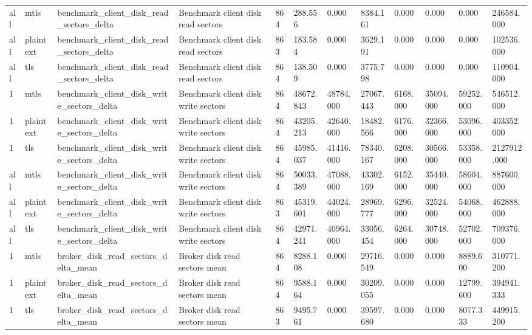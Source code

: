 \begin{longtable}{llllllllllll}
all & mtls & benchmark\_client\_disk\_read\_sectors\_delta & Benchmark client disk read sectors & 864 & 288.556 & 0.000 & 8384.161 & 0.000 & 0.000 & 0.000 & 246584.000 \\
all & plaintext & benchmark\_client\_disk\_read\_sectors\_delta & Benchmark client disk read sectors & 863 & 183.584 & 0.000 & 3629.191 & 0.000 & 0.000 & 0.000 & 102536.000 \\
all & tls & benchmark\_client\_disk\_read\_sectors\_delta & Benchmark client disk read sectors & 864 & 138.509 & 0.000 & 3775.798 & 0.000 & 0.000 & 0.000 & 110904.000 \\
1 & mtls & benchmark\_client\_disk\_write\_sectors\_delta & Benchmark client disk write sectors & 864 & 48672.843 & 48784.000 & 27067.443 & 6168.000 & 35094.000 & 59252.000 & 546512.000 \\
1 & plaintext & benchmark\_client\_disk\_write\_sectors\_delta & Benchmark client disk write sectors & 864 & 43205.213 & 42640.000 & 18482.566 & 6176.000 & 32366.000 & 53096.000 & 403352.000 \\
1 & tls & benchmark\_client\_disk\_write\_sectors\_delta & Benchmark client disk write sectors & 864 & 45985.037 & 41416.000 & 78340.167 & 6208.000 & 30566.000 & 53358.000 & 2127912.000 \\
all & mtls & benchmark\_client\_disk\_write\_sectors\_delta & Benchmark client disk write sectors & 864 & 50033.389 & 47088.000 & 43302.169 & 6152.000 & 35440.000 & 58604.000 & 887600.000 \\
all & plaintext & benchmark\_client\_disk\_write\_sectors\_delta & Benchmark client disk write sectors & 863 & 45319.601 & 44024.000 & 28969.777 & 6296.000 & 32524.000 & 54068.000 & 462888.000 \\
all & tls & benchmark\_client\_disk\_write\_sectors\_delta & Benchmark client disk write sectors & 864 & 42971.241 & 40964.000 & 33056.454 & 6264.000 & 30748.000 & 52702.000 & 709376.000 \\
1 & mtls & broker\_disk\_read\_sectors\_delta\_mean & Broker disk read sectors mean & 864 & 8288.108 & 0.000 & 29716.549 & 0.000 & 0.000 & 8889.600 & 310771.200 \\
1 & plaintext & broker\_disk\_read\_sectors\_delta\_mean & Broker disk read sectors mean & 864 & 9588.164 & 0.000 & 30209.055 & 0.000 & 0.000 & 12799.600 & 394941.333 \\
1 & tls & broker\_disk\_read\_sectors\_delta\_mean & Broker disk read sectors mean & 863 & 9495.761 & 0.000 & 39597.680 & 0.000 & 0.000 & 8077.333 & 449915.200 \\

\end{longtable}
